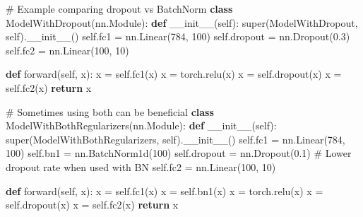 \documentclass[
  letterpaper,
  DIV=11,
  numbers=noendperiod]{scrreprt}
\newenvironment{Shaded}{\begin{snugshade}}{\end{snugshade}}
\newcommand{\BuiltInTok}[1]{\textcolor[rgb]{0.00,0.23,0.31}{#1}}
\newcommand{\CommentTok}[1]{\textcolor[rgb]{0.37,0.37,0.37}{#1}}
\newcommand{\ControlFlowTok}[1]{\textcolor[rgb]{0.00,0.23,0.31}{\textbf{#1}}}
\newcommand{\DecValTok}[1]{\textcolor[rgb]{0.68,0.00,0.00}{#1}}
\newcommand{\FloatTok}[1]{\textcolor[rgb]{0.68,0.00,0.00}{#1}}
\newcommand{\FunctionTok}[1]{\textcolor[rgb]{0.28,0.35,0.67}{#1}}
\newcommand{\KeywordTok}[1]{\textcolor[rgb]{0.00,0.23,0.31}{\textbf{#1}}}
\newcommand{\NormalTok}[1]{\textcolor[rgb]{0.00,0.23,0.31}{#1}}
\newcommand{\OperatorTok}[1]{\textcolor[rgb]{0.37,0.37,0.37}{#1}}
\newcommand{\VariableTok}[1]{\textcolor[rgb]{0.07,0.07,0.07}{#1}}
\begin{document}
\begin{Shaded}
\begin{Highlighting}[]
\CommentTok{\# Example comparing dropout vs BatchNorm}
\KeywordTok{class}\NormalTok{ ModelWithDropout(nn.Module):}
    \KeywordTok{def} \FunctionTok{\_\_init\_\_}\NormalTok{(}\VariableTok{self}\NormalTok{):}
        \BuiltInTok{super}\NormalTok{(ModelWithDropout, }\VariableTok{self}\NormalTok{).}\FunctionTok{\_\_init\_\_}\NormalTok{()}
        \VariableTok{self}\NormalTok{.fc1 }\OperatorTok{=}\NormalTok{ nn.Linear(}\DecValTok{784}\NormalTok{, }\DecValTok{100}\NormalTok{)}
        \VariableTok{self}\NormalTok{.dropout }\OperatorTok{=}\NormalTok{ nn.Dropout(}\FloatTok{0.3}\NormalTok{)}
        \VariableTok{self}\NormalTok{.fc2 }\OperatorTok{=}\NormalTok{ nn.Linear(}\DecValTok{100}\NormalTok{, }\DecValTok{10}\NormalTok{)}
        
    \KeywordTok{def}\NormalTok{ forward(}\VariableTok{self}\NormalTok{, x):}
\NormalTok{        x }\OperatorTok{=} \VariableTok{self}\NormalTok{.fc1(x)}
\NormalTok{        x }\OperatorTok{=}\NormalTok{ torch.relu(x)}
\NormalTok{        x }\OperatorTok{=} \VariableTok{self}\NormalTok{.dropout(x)}
\NormalTok{        x }\OperatorTok{=} \VariableTok{self}\NormalTok{.fc2(x)}
        \ControlFlowTok{return}\NormalTok{ x}

\CommentTok{\# Sometimes using both can be beneficial}
\KeywordTok{class}\NormalTok{ ModelWithBothRegularizers(nn.Module):}
    \KeywordTok{def} \FunctionTok{\_\_init\_\_}\NormalTok{(}\VariableTok{self}\NormalTok{):}
        \BuiltInTok{super}\NormalTok{(ModelWithBothRegularizers, }\VariableTok{self}\NormalTok{).}\FunctionTok{\_\_init\_\_}\NormalTok{()}
        \VariableTok{self}\NormalTok{.fc1 }\OperatorTok{=}\NormalTok{ nn.Linear(}\DecValTok{784}\NormalTok{, }\DecValTok{100}\NormalTok{)}
        \VariableTok{self}\NormalTok{.bn1 }\OperatorTok{=}\NormalTok{ nn.BatchNorm1d(}\DecValTok{100}\NormalTok{)}
        \VariableTok{self}\NormalTok{.dropout }\OperatorTok{=}\NormalTok{ nn.Dropout(}\FloatTok{0.1}\NormalTok{)  }\CommentTok{\# Lower dropout rate when used with BN}
        \VariableTok{self}\NormalTok{.fc2 }\OperatorTok{=}\NormalTok{ nn.Linear(}\DecValTok{100}\NormalTok{, }\DecValTok{10}\NormalTok{)}
        
    \KeywordTok{def}\NormalTok{ forward(}\VariableTok{self}\NormalTok{, x):}
\NormalTok{        x }\OperatorTok{=} \VariableTok{self}\NormalTok{.fc1(x)}
\NormalTok{        x }\OperatorTok{=} \VariableTok{self}\NormalTok{.bn1(x)}
\NormalTok{        x }\OperatorTok{=}\NormalTok{ torch.relu(x)}
\NormalTok{        x }\OperatorTok{=} \VariableTok{self}\NormalTok{.dropout(x)}
\NormalTok{        x }\OperatorTok{=} \VariableTok{self}\NormalTok{.fc2(x)}
        \ControlFlowTok{return}\NormalTok{ x}
\end{Highlighting}
\end{Shaded}
\end{document}
